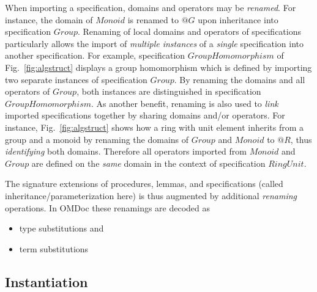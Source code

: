 \documentclass{article}
\theoremstyle{remark}
\theoremstyle{definition}
\newcommand{\name}[1]{\mathit{#1}}
\begin{document}
When importing a specification, domains and operators may be \emph{renamed}. For instance, the domain of
$\name{Monoid}$ is renamed to $@G$ upon inheritance into specification $\name{Group}$. Renaming of local domains and
operators of specifications particularly allows the import of \emph{multiple instances} of a \emph{single}
specification into another specification. For example, specification $\name{GroupHomomorphism}$ of
Fig.~\ref{fig:algstruct} displays a group homomorphism which is defined by importing two separate instances of
specification $\name{Group}$. By renaming the domains and all operators of $\name{Group}$, both instances are
distinguished in specification $\name{GroupHomomorphism}$. As another benefit, renaming is also used to \emph{link}
imported specifications together by sharing domains and/or operators. For instance, Fig.~\ref{fig:algstruct} shows how
a ring with unit element inherits from a group and a monoid by renaming the domains of $\name{Group}$ and
$\name{Monoid}$ to $@R$, thus \emph{identifying} both domains. Therefore all operators imported from $\name{Monoid}$
and $\name{Group}$ are defined on the \emph{same} domain in the context of specification $\name{RingUnit}$.

The signature extensions of procedures, lemmas, and specifications (called inheritance/parameterization here) is thus
augmented by additional \emph{renaming} operations. In OMDoc these renamings are decoded as
\begin{itemize}
  \item type substitutions and
  \item term substitutions
\end{itemize}



\subsection{Instantiation}
\end{document}
